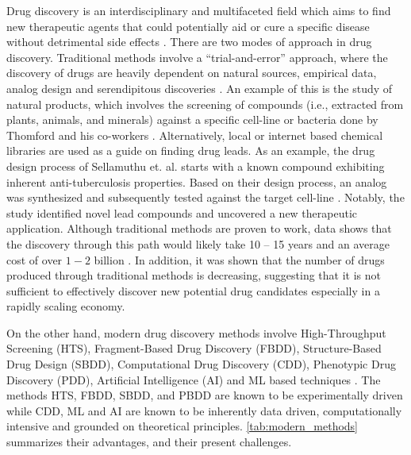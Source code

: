 \setlength{\parindent}{0pt}

Drug discovery is an interdisciplinary and multifaceted field which aims to find new therapeutic agents that could potentially aid or cure a specific disease without detrimental side effects \cite{araujo2018interdisciplinarity}. There are two modes of approach in drug discovery. Traditional methods involve a “trial-and-error” approach, where the discovery of drugs are heavily dependent on natural sources, empirical data, analog design and serendipitous discoveries \cite{article}. An example of this is the study of natural products, which involves the screening of compounds (i.e., extracted from plants, animals, and minerals) against a specific cell-line or bacteria done by Thomford and his co-workers \cite{ijms19061578}. Alternatively, local or internet based chemical libraries are used as a guide on finding drug leads. As an example, the drug design process of Sellamuthu et. al. starts with a known compound exhibiting inherent anti-tuberculosis properties. Based on their design process, an analog was synthesized and subsequently tested against the target cell-line \cite{sellamuthu2023analog}. Notably, the study identified novel lead compounds and uncovered a new therapeutic application. Although traditional methods are proven to work, data shows that the discovery through this path would likely take 10 – 15 years and an average cost of over $1-2$ billion \cite{sun202290}. In addition, it was shown that the number of drugs produced through traditional methods is decreasing, suggesting that it is not sufficient to effectively discover new potential drug candidates \cite{pinzi2024drug} especially in a rapidly scaling economy.  

On the other hand, modern drug discovery methods involve High-Throughput Screening (HTS), Fragment-Based Drug Discovery (FBDD), Structure-Based Drug Design (SBDD), Computational Drug Discovery (CDD), Phenotypic Drug Discovery (PDD), Artificial Intelligence (AI) and ML based techniques \cite{article}. The methods HTS, FBDD, SBDD, and PBDD are known to be experimentally driven while CDD, ML and AI are known to be inherently data driven, computationally intensive and grounded on theoretical principles. \autoref{tab:modern_methods} summarizes their advantages, and their present challenges.  

